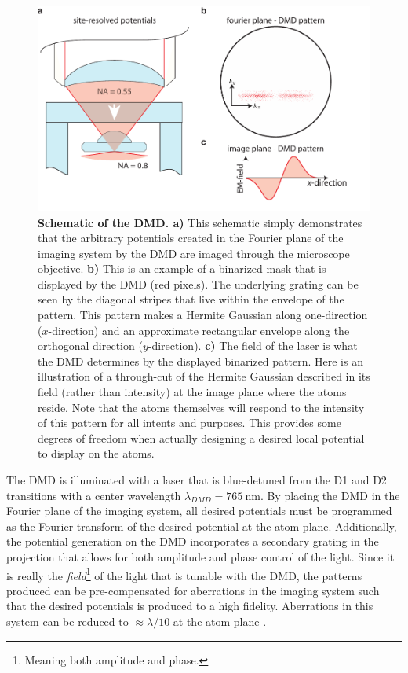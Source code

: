 \begin{figure}[t!]
		\includegraphics[width=\columnwidth]{figures/ch2/QGM/imaging_system_dmd_v2.pdf} 
		\caption{\textbf{Schematic of the DMD. a)} This schematic simply demonstrates that the arbitrary potentials created in the Fourier plane of the imaging system by the DMD are imaged through the microscope objective. \textbf{b)} This is an example of a binarized mask that is displayed by the DMD (red pixels). The underlying grating can be seen by the diagonal stripes that live within the envelope of the pattern. This pattern makes a Hermite Gaussian along one-direction ($x$-direction) and an approximate rectangular envelope along the orthogonal direction ($y$-direction). \textbf{c)} The field of the laser is what the DMD determines by the displayed binarized pattern. Here is an illustration of a through-cut of the Hermite Gaussian described in its field (rather than intensity) at the image plane where the atoms reside. Note that the atoms themselves will respond to the intensity of this pattern for all intents and purposes. This provides some degrees of freedom when actually designing a desired local potential to display on the atoms.}
		\label{fig:qgm_FP_DMD}
\end{figure}

The DMD is illuminated with a laser that is blue-detuned from the D1 and D2 transitions with a center wavelength $\lambda_{DMD} = 765~\mathrm{nm}$. By placing the DMD in the Fourier plane of the imaging system, all desired potentials must be programmed as the Fourier transform of the desired potential at the atom plane. Additionally, the potential generation on the DMD incorporates a secondary grating in the projection that allows for both amplitude and phase control of the light. Since it is really the \emph{field}\footnote{Meaning both amplitude and phase.} of the light that is tunable with the DMD, the patterns produced can be pre-compensated for aberrations in the imaging system such that the desired potentials is produced to a high fidelity. Aberrations in this system can be reduced to $\approx \lambda/10$ at the atom plane \cite{Zupancic2016,Lukin2018Th}.

